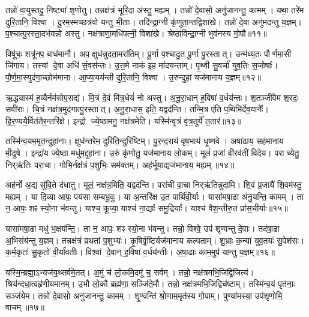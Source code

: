 तन्नो॑ वा॒युस्तदु॒ निष्ट्या॑ शृणोतु।
तन्नक्ष॑त्रं भूरि॒दा अ॑स्तु॒ मह्यम्।
तन्नो॑ दे॒वासो॒ अनु॑जानन्तु॒ कामम्।
यथा॒ तरे॑म दुरि॒तानि॒ विश्वा।
दू॒रम॒स्मच्छत्र॑वो यन्तु भी॒ताः।
तदि॑न्द्रा॒ग्नी कृ॑णुता॒न्तद्विशा॑खे।
तन्नो॑ दे॒वा अनु॑मदन्तु य॒ज्ञम्।
प॒श्चात्पु॒रस्ता॒दभ॑यन्नो अस्तु।
नक्ष॑त्राणा॒मधि॑पत्नी॒ विशा॑खे।
श्रेष्ठा॑विन्द्रा॒ग्नी भुव॑नस्य गो॒पौ॥११॥

विषू॑चः॒ शत्रू॑नप॒ बाध॑मानौ।
अप॒ क्षुध॑न्नुदता॒मरा॑तिम्।
पू॒र्णा प॒श्चादु॒त पू॒र्णा पु॒रस्तात्।
उन्म॑ध्य॒तः पौर्णमा॒सी जि॑गाय।
तस्यां दे॒वा अधि॑ सं॒वस॑न्तः।
उ॒त्त॒मे नाक॑ इ॒ह मा॑दयन्ताम्।
पृ॒थ्वी सु॒वर्चा॑ युव॒तिः स॒जोषाः᳚।
पौ॒र्ण॒मा॒स्युद॑गा॒च्छोभ॑माना।
आ॒प्या॒यय॑न्ती दुरि॒तानि॒ विश्वा।
उ॒रुन्दुहां॒ यज॑मानाय य॒ज्ञम्॥१२॥\anuvakamend[चि॒त्रभा॑नु॒र्यज॑माने दधातु ह॒विर्नः॒ पाथ॒श्चेतो॑ जुषन्ता॒ञ्चेतो॑ मदेम॒ रोच॑माना॒मरा॑तीर्गो॒पौ य॒ज्ञम्]

ऋ॒द्ध्यास्म॑ ह॒व्यैर्नम॑सोप॒सद्य॑।
मि॒त्रं दे॒वं मि॑त्र॒धेयं॑ नो अस्तु।
अ॒नू॒रा॒धान् ह॒विषा॑ व॒र्धय॑न्तः।
श॒तञ्जी॑वेम श॒रदः॒ सवी॑राः।
चि॒त्रं नक्ष॑त्र॒मुद॑गात्पु॒रस्तात्।
अ॒नू॒रा॒धास॒ इति॒ यद्वद॑न्ति।
तन्मि॒त्र ए॑ति प॒थिभि॑र्देव॒यानैः᳚।
हि॒र॒ण्ययै॒र्वित॑तैर॒न्तरि॑क्षे।
इन्द्रो ज्ये॒ष्ठामनु॒ नक्ष॑त्रमेति।
यस्मि॑न्वृ॒त्रं वृ॑त्र॒तूर्ये॑ त॒तार॑॥१३॥

तस्मि॑न्व॒यम॒मृत॒न्दुहा॑नाः।
क्षुध॑न्तरेम॒ दुरि॑ति॒न्दुरि॑ष्टिम्।
पु॒र॒न्द॒राय॑ वृष॒भाय॑ धृ॒ष्णवे।
अषा॑ढाय॒ सह॑मानाय मी॒ढुषे।
इन्द्रा॑य ज्ये॒ष्ठा मधु॑म॒द्दुहा॑ना।
उ॒रुं कृ॑णोतु॒ यज॑मानाय लो॒कम्।
मूलं॑ प्र॒जां वी॒रव॑तीं विदेय।
पराच्येतु॒ निर्‌\mbox{}ऋ॑तिः परा॒चा।
गोभि॒र्नक्ष॑त्रं प॒शुभिः॒ सम॑क्तम्।
अह॑र्भूया॒द्यज॑मानाय॒ मह्यम्॥१४॥

अह॑र्नो अ॒द्य सु॑वि॒ते द॑धातु।
मूलं॒ नक्ष॑त्र॒मिति॒ यद्वद॑न्ति।
परा॑चीं वा॒चा निर्‌\mbox{}ऋ॑तिन्नुदामि।
शि॒वं प्र॒जायै॑ शि॒वम॑स्तु॒ मह्यम्।
या दि॒व्या आपः॒ पय॑सा सम्बभू॒वुः।
या अ॒न्तरि॑क्ष उ॒त पार्थि॑वी॒र्याः।
यासा॑मषा॒ढा अ॑नु॒यन्ति॒ कामम्।
ता न॒ आपः॒ शꣴ स्यो॒ना भ॑वन्तु।
याश्च॒ कूप्या॒ याश्च॑ ना॒द्याः᳚ समु॒द्रियाः᳚।
याश्च॑ वैश॒न्तीरु॒त प्रा॑स॒चीर्याः॥१५॥

यासा॑मषा॒ढा मधु॑ भ॒क्षय॑न्ति॒।
ता न॒ आपः॒ शꣴ स्यो॒ना भ॑वन्तु।
तन्नो॒ विश्वे॒ उप॑ शृण्वन्तु दे॒वाः।
तद॑षा॒ढा अ॒भिसंय॑न्तु य॒ज्ञम्।
तन्नक्ष॑त्रं प्रथतां प॒शुभ्यः॑।
कृ॒षिर्वृ॒ष्टिर्यज॑मानाय कल्पताम्।
शु॒भ्राः क॒न्या॑ युव॒तयः॑ सु॒पेश॑सः।
क॒र्म॒कृतः॑ सु॒कृतो॑ वी॒र्या॑वतीः।
विश्वां दे॒वान् ह॒विषा॑ व॒र्धय॑न्तीः।
अ॒षा॒ढाः काम॒मुप॑ यान्तु य॒ज्ञम्॥१६॥

यस्मि॒न्ब्रह्मा॒\-ऽभ्यज॑य॒थ्सर्व॑मे॒तत्।
अ॒मुं च॑ लो॒कमि॒दमू॑ च॒ सर्वम्।
तन्नो॒ नक्ष॑त्रमभि॒जिद्वि॒जित्य॑।
श्रिय॑न्दधा॒त्वहृ॑णीयमानम्।
उ॒भौ लो॒कौ ब्रह्म॑णा॒ सञ्जि॑ते॒मौ।
तन्नो॒ नक्ष॑त्रमभि॒जिद्विच॑ष्टाम्।
तस्मि॑न्व॒यं पृत॑नाः॒ सञ्ज॑येम।
तन्नो॑ दे॒वासो॒ अनु॑जानन्तु॒ कामम्।
शृ॒ण्वन्ति॑ श्रो॒णाम॒मृत॑स्य गो॒पाम्।
पुण्या॑मस्या॒ उप॑शृणोमि॒ वाचम्॥१७॥

